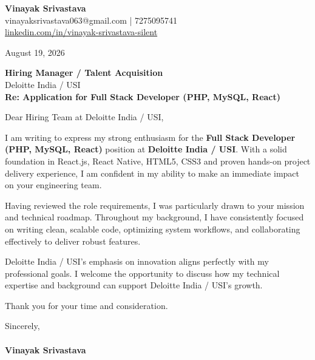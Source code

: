 \documentclass[11pt,a4paper]{article}
\begin{document}
\thispagestyle{empty}

{\Large \textbf{Vinayak Srivastava}}\\
vinayaksrivastava063@gmail.com | 7275095741 \\
\url{linkedin.com/in/vinayak-srivastava-silent}

\vspace{1em}
\hfill August 19, 2026

\textbf{Hiring Manager / Talent Acquisition}\\
Deloitte India / USI\\

\vspace{1.5em}
\textbf{Re: Application for Full Stack Developer (PHP, MySQL, React)}

\vspace{1em}
Dear Hiring Team at Deloitte India / USI,

I am writing to express my strong enthusiasm for the \textbf{Full Stack Developer (PHP, MySQL, React)} position at \textbf{Deloitte India / USI}. With a solid foundation in React.js, React Native, HTML5, CSS3 and proven hands-on project delivery experience, I am confident in my ability to make an immediate impact on your engineering team.

Having reviewed the role requirements, I was particularly drawn to your mission and technical roadmap. Throughout my background, I have consistently focused on writing clean, scalable code, optimizing system workflows, and collaborating effectively to deliver robust features.

Deloitte India / USI's emphasis on innovation aligns perfectly with my professional goals. I welcome the opportunity to discuss how my technical expertise and background can support Deloitte India / USI's growth.

Thank you for your time and consideration.

\vspace{1.5em}
Sincerely,\\
\vspace{1em}\\
\textbf{Vinayak Srivastava}
\end{document}
